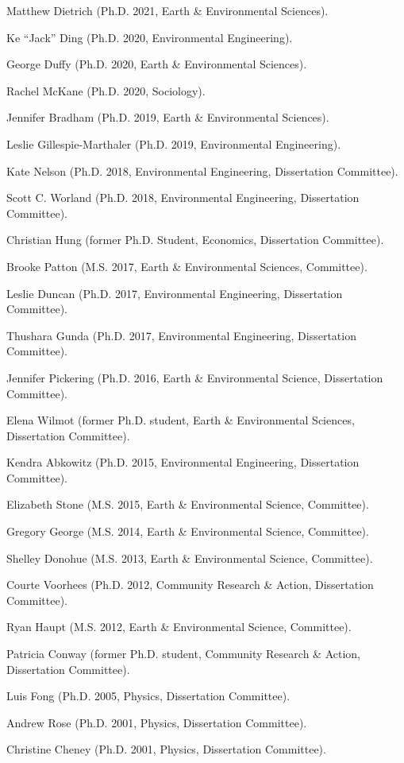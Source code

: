 \item Matthew Dietrich (Ph.D. 2021, Earth \& Environmental Sciences).
\item Ke ``Jack'' Ding (Ph.D. 2020, Environmental Engineering).
\item George Duffy (Ph.D. 2020, Earth \& Environmental Sciences).
\item Rachel McKane (Ph.D. 2020, Sociology).
\item Jennifer Bradham (Ph.D. 2019, Earth \& Environmental Sciences).
\item Leslie Gillespie-Marthaler (Ph.D. 2019, Environmental Engineering).
\item Kate Nelson (Ph.D. 2018, Environmental Engineering, Dissertation Committee).
\item Scott C. Worland (Ph.D. 2018, Environmental Engineering, Dissertation Committee).
\item Christian Hung (former Ph.D. Student, Economics, Dissertation Committee).
\item Brooke Patton (M.S. 2017, Earth \& Environmental Sciences, Committee).
\item Leslie Duncan (Ph.D. 2017, Environmental Engineering, Dissertation Committee).
\item Thushara Gunda (Ph.D. 2017, Environmental Engineering, Dissertation Committee).
\item Jennifer Pickering (Ph.D. 2016, Earth \& Environmental Science, Dissertation Committee).
\item Elena Wilmot (former Ph.D. student, Earth \& Environmental Sciences, Dissertation Committee).
\item Kendra Abkowitz (Ph.D. 2015, Environmental Engineering, Dissertation Committee).
\item Elizabeth Stone (M.S. 2015, Earth \& Environmental Science, Committee).
\item Gregory George (M.S. 2014, Earth \& Environmental Science, Committee).
\item Shelley Donohue (M.S. 2013, Earth \& Environmental Science, Committee).
\item Courte Voorhees (Ph.D. 2012,  Community Research \& Action, Dissertation Committee).
\item Ryan Haupt (M.S. 2012, Earth \& Environmental Science, Committee).
\item Patricia Conway (former Ph.D. student, Community Research \& Action, Dissertation Committee).
\item Luis Fong (Ph.D. 2005, Physics, Dissertation Committee).
\item Andrew Rose (Ph.D. 2001, Physics, Dissertation Committee).
\item Christine Cheney (Ph.D. 2001, Physics, Dissertation Committee).
